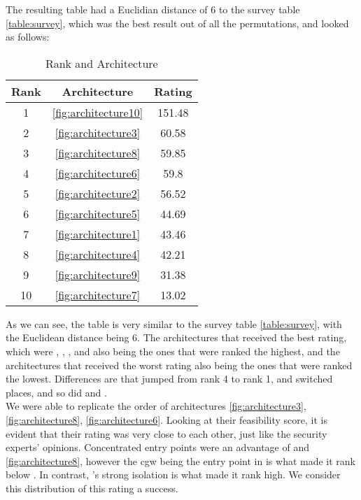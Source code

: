 \label{sec:calibration}

The resulting table had a Euclidian distance of 6 to the survey table \ref{table:survey}, which was the best result out of all the permutations, and looked as follows:\\

\begin{table}[h]
    \label{table:testcriteriaresults}
    \centering
    \caption{Rank and Architecture}
    \begin{tabular}{ |c|c|c| } 
    \hline
    Rank & Architecture & Rating\\
    \hline
    1 & \ref{fig:architecture10} & 151.48\\
    2 & \ref{fig:architecture3} & 60.58\\
    3 & \ref{fig:architecture8} & 59.85\\
    4 & \ref{fig:architecture6} & 59.8\\
    5 & \ref{fig:architecture2} & 56.52\\
    6 & \ref{fig:architecture5} & 44.69\\
    7 & \ref{fig:architecture1} & 43.46\\
    8 & \ref{fig:architecture4} & 42.21\\
    9 & \ref{fig:architecture9} & 31.38\\
    10 & \ref{fig:architecture7} & 13.02\\
    \hline
    \end{tabular}
\end{table}

As we can see, the table is very similar to the survey table \ref{table:survey}, with the Euclidean distance being 6.
The architectures that received the best rating, which were 
, , , and  
also being the ones that were ranked the highest,
and the architectures that received the worst rating also being the ones that were ranked the lowest.
Differences are that  jumped from rank 4 to rank 1,  and  switched places, 
and so did  and .\\

We were able to replicate the order of architectures \ref{fig:architecture3}, \ref{fig:architecture8}, \ref{fig:architecture6}.
Looking at their feasibility score, it is evident that their rating was very close to each other, just like the security experts' opinions.
Concentrated entry points were an advantage of  and \ref{fig:architecture8}, 
however the \acrshort{cgw} being the entry point in  is what made it rank below .
In contrast, 's strong isolation is what made it rank high.
We consider this distribution of this rating a success.\\

